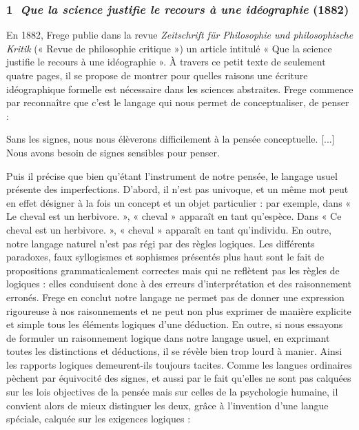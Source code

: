 \subsubsection*{\textcircled{\scriptsize 1} \textit{Que la science justifie le recours à une idéographie} (1882)}
En 1882, Frege publie dans la revue \textit{Zeitschrift für Philosophie und philosophische Kritik} (« Revue de philosophie critique ») un article intitulé « Que la science justifie le recours à une idéographie ». À travers ce petit texte de seulement quatre pages, il se propose de montrer pour quelles raisons une écriture idéographique formelle est nécessaire dans les sciences abstraites. Frege commence par reconnaître que c’est le langage qui nous permet de conceptualiser, de penser :

\begin{lecture}{}
Sans les signes, nous nous élèverons difficilement à la pensée conceptuelle. [...] Nous avons besoin de signes sensibles pour penser.
\end{lecture}

Puis il précise que bien qu’étant l’instrument de notre pensée, le langage usuel présente des imperfections. D’abord, il n’est pas univoque, et un même mot peut en effet désigner à la fois un concept et un objet particulier : par exemple, dans « Le cheval est un herbivore. », « cheval » apparaît en tant qu’espèce. Dans « Ce cheval est un herbivore. », « cheval » apparaît en tant qu’individu. En outre, notre langage naturel n’est pas régi par des règles logiques. Les différents paradoxes, faux syllogismes et sophismes présentés plus haut sont le fait de propositions grammaticalement correctes mais qui ne reflètent pas les règles de logiques : elles conduisent donc à des erreurs d’interprétation et des raisonnement erronés. Frege en conclut notre langage ne permet pas de donner une expression rigoureuse à nos raisonnements et ne peut non plus exprimer de manière explicite et simple tous les éléments logiques d’une déduction. En outre, si nous essayons de formuler un raisonnement logique dans notre langage usuel, en exprimant toutes les distinctions et déductions, il se révèle bien trop lourd à manier. Ainsi les rapports logiques demeurent-ils toujours tacites. Comme les langues ordinaires pèchent par équivocité des signes, et aussi par le fait qu’elles ne sont pas calquées sur les lois objectives de la pensée mais sur celles de la psychologie humaine, il convient alors de mieux distinguer les deux, grâce à l’invention d’une langue spéciale, calquée sur les exigences logiques :


